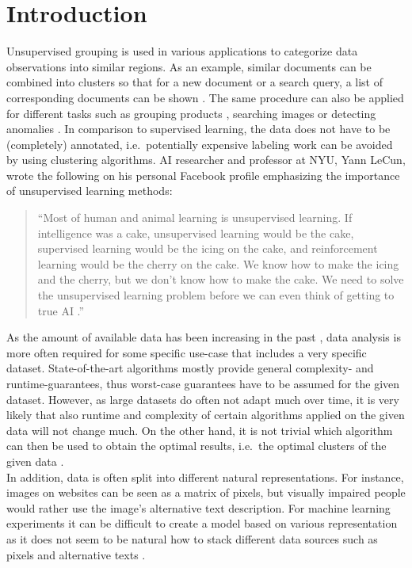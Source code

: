 \chapter{Introduction}


Unsupervised grouping is used in various applications to categorize data observations into similar regions. As an example, similar documents can be combined into clusters so that for a new document or a search query, a list of corresponding documents can be shown \cite{zamir1998web}. The same procedure can also be applied for different tasks such as grouping products \cite{balakrishnan2018product}, searching images \cite{lin2018dimensionality} or detecting anomalies \cite{he2003discovering}. In comparison to supervised learning, the data does not have to be (completely) annotated, i.e.\ potentially expensive labeling work can be avoided by using clustering algorithms. AI researcher and professor at NYU, Yann LeCun, wrote the following on his personal Facebook profile emphasizing the importance of unsupervised learning methods:

\blockquote{``Most of human and animal learning is unsupervised learning. If intelligence was a cake, unsupervised learning would be the cake, supervised learning would be the icing on the cake, and reinforcement learning would be the cherry on the cake. We know how to make the icing and the cherry, but we don’t know how to make the cake. We need to solve the unsupervised learning problem before we can even think of getting to true AI \cite{lecun}.''}

As the amount of available data has been increasing in the past \cite{wamba2015big}, data analysis is more often required for some specific use-case that includes a very specific dataset. State-of-the-art algorithms mostly provide general complexity- and runtime-guarantees, thus worst-case guarantees have to be assumed for the given dataset. However, as large datasets do often not adapt much over time, it is very likely that also runtime and complexity of certain algorithms applied on the given data will not change much. On the other hand, it is not trivial which algorithm can then be used to obtain the optimal results, i.e.\ the optimal clusters of the given data \cite{DBLP:journals/corr/GuptaR15b}.\\

In addition, data is often split into different natural representations. For instance, images on websites can be seen as a matrix of pixels, but visually impaired people would rather use the image's alternative text description. For machine learning experiments it can be difficult to create a model based on various representation as it does not seem to be natural how to stack different data sources such as pixels and alternative texts \cite{cebral2018combining}.\\

